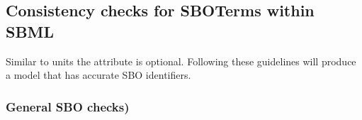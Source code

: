 \subsection{Consistency checks for SBOTerms within SBML}

Similar to units the  attribute is optional.  Following these
guidelines will produce a model that has accurate SBO identifiers.

\subsubsection*{General SBO checks)} \begin{sbmlenum}


\end{sbmlenum}
